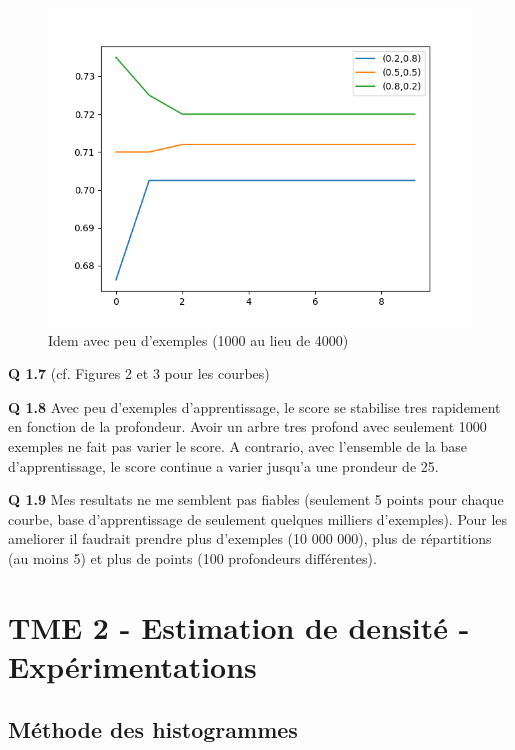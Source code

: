 \documentclass[a4paper]{article}
\begin{document}
\begin{figure}[ht!]
\begin{center}
\includegraphics[scale=0.5]{Figure_3}
\caption{Idem avec peu d'exemples (1000 au lieu de 4000)}
\label{apprentissage_prof2}
\end{center}
\end{figure}

\textbf{Q 1.7} (cf. Figures 2 et 3 pour les courbes)

\textbf{Q 1.8} Avec peu d'exemples d'apprentissage, le score se stabilise tres rapidement en fonction de la profondeur. Avoir un arbre tres profond avec seulement 1000 exemples ne fait pas varier le score. A contrario, avec l'ensemble de la base d'apprentissage, le score continue a varier jusqu'a une prondeur de 25.

\textbf{Q 1.9} Mes resultats ne me semblent pas fiables (seulement 5 points pour chaque courbe, base d'apprentissage de seulement quelques milliers d'exemples). Pour les ameliorer il faudrait prendre plus d'exemples (10 000 000), plus de répartitions (au moins 5) et plus de points (100 profondeurs différentes).



\section*{TME 2 - Estimation de densité - Expérimentations}

\subsection*{Méthode des histogrammes}
\end{document}
